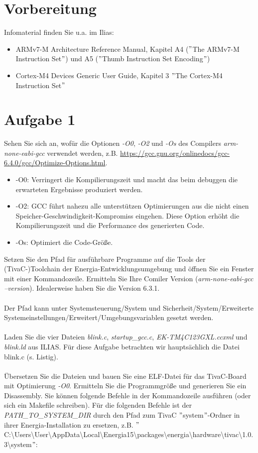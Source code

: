 \newpage
\section{Vorbereitung}
Infomaterial finden Sie u.a. im Ilias:
\begin{itemize}
	\item ARMv7-M Architecture Reference Manual, Kapitel A4 ($"$The ARMv7-M Instruction Set$"$) und A5 ($"$Thumb Instruction Set Encoding$"$)
	\item Cortex-M4 Devices Generic User Guide, Kapitel 3 $"$The Cortex-M4 Instruction Set$"$
\end{itemize}
\section{Aufgabe 1}
Sehen Sie sich an, wofür die Optionen \textit{-O0}, \textit{-O2} und \textit{-Os} des Compilers \textit{arm-none-eabi-gcc} verwendet werden, z.B. \url{https://gcc.gnu.org/onlinedocs/gcc-6.4.0/gcc/Optimize-Options.html}.
\begin{itemize}
	\item -O0: Verringert die Kompilierungszeit und macht das beim debuggen die erwarteten Ergebnisse produziert werden.
	\item -O2: GCC führt nahezu alle unterstützen Optimierungen aus die nicht einen Speicher-Geschwindigkeit-Kompromiss eingehen. Diese Option erhöht die Kompilierungszeit und die Performance des generierten Code.
	\item -Os: Optimiert die Code-Grö\ss{}e.
\end{itemize}
Setzen Sie den Pfad für ausführbare Programme auf die Tools der (TivaC-)Toolchain der Energia-Entwicklungsumgebung und öffnen Sie ein Fenster mit einer Kommandozeile. Ermitteln Sie Ihre Comiler Version (\textit{arm-none-eabi-gcc --version}). Idealerweise haben Sie die Version 6.3.1.\\ \\
Der Pfad kann unter Systemsteuerung/System und Sicherheit/System/Erweiterte Systemeinstellungen/Erweitert/Umgebungsvariablen gesetzt werden.\\ \\
Laden Sie die vier Dateien \textit{blink.c}, \textit{startup\_gcc.c}, \textit{EK-TM4C123GXL.ccxml} und \textit{blink.ld} aus ILIAS. Für diese Aufgabe betrachten wir hauptsächlich die Datei blink.c (s. Listig).\\ \\
Übersetzen Sie die Dateien und bauen Sie eine ELF-Datei für das TivaC-Board mit Optimierung \textit{-O0}. Ermitteln Sie die Programmgrö\ss{}e und generieren Sie ein Disassembly. Sie können folgende Befehle in der Kommandozeile ausführen (oder sich ein Makefile schreiben). Für die folgenden Befehle ist der \textit{{PATH\_TO\_SYSTEM\_DIR}} durch den Pfad zum TivaC $"$system$"$-Ordner in ihrer Energia-Installation zu ersetzen, z.B. $"$C:\textbackslash Users\textbackslash User\textbackslash AppData\textbackslash Local\textbackslash Energia15\textbackslash packages\textbackslash energia\textbackslash hardware\textbackslash tivac\textbackslash 1.0.3\textbackslash system$"$:\\ \\
